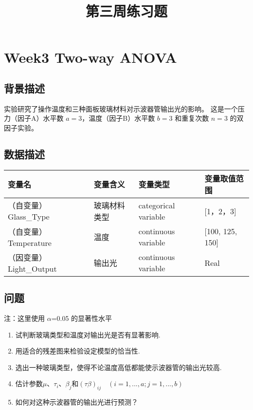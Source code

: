 \documentclass[11pt]{ctexart}
\title{第三周练习题}
\providecommand{\tightlist}{%
      \setlength{\itemsep}{0pt}\setlength{\parskip}{0pt}}
\begin{document}
    
    \maketitle
    
    

    
    \hypertarget{week3-two-way-anova}{%
\section{Week3 Two-way ANOVA}\label{week3-two-way-anova}}

\hypertarget{ux80ccux666fux63cfux8ff0}{%
\subsection{背景描述}\label{ux80ccux666fux63cfux8ff0}}

实验研究了操作温度和三种面板玻璃材料对示波器管输出光的影响。
这是一个压力（因子A）水平数 \(a=3\)，温度（因子B）水平数 \(b=3\)
和重复次数 \(n=3\) 的双因子实验。

    \hypertarget{ux6570ux636eux63cfux8ff0}{%
\subsection{数据描述}\label{ux6570ux636eux63cfux8ff0}}

\begin{longtable}[]{llll}
\toprule
变量名 & 变量含义 & 变量类型 & 变量取值范围 \\
\midrule
\endhead
（自变量）Glass\_Type & 玻璃材料类型 & categorical variable &
{[}1，2，3{]} \\
（自变量）Temperature & 温度 & continuous variable & {[}100, 125,
150{]} \\
（因变量）Light\_Output & 输出光 & continuous variable & Real \\
\bottomrule
\end{longtable}

    \hypertarget{ux95eeux9898}{%
\subsection{问题}\label{ux95eeux9898}}

注：这里使用 \(\alpha\)=0.05 的显著性水平

\begin{enumerate}
\def\labelenumi{\arabic{enumi}.}
\tightlist
\item
  试判断玻璃类型和温度对输出光是否有显著影响.
\item
  用适合的残差图来检验设定模型的恰当性.
\item
  选出一种玻璃类型，使得不论温度高低都能使示波器管的输出光较高.
\item
  估计参数\(\mu\)、\(\tau_i\)、\(\beta_j\)和\((\tau\beta)_{ij}\quad(i=1,...,a;j=1,...,b)\)
\item
  如何对这种示波器管的输出光进行预测？
\end{enumerate}
\end{document}
